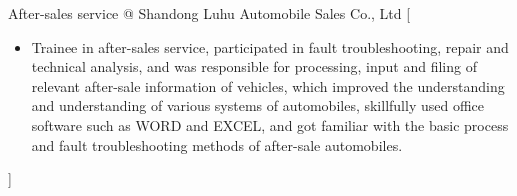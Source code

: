 \documentclass{resume}
\begin{document}
\begin{experiences}
	{After-sales service @ Shandong Luhu Automobile Sales Co., Ltd}%
	[\begin{itemize}
		\item Trainee in after-sales service, participated in fault troubleshooting, repair and technical analysis, and was responsible for processing, input and filing of relevant after-sale information of vehicles, which improved the understanding and understanding of various systems of automobiles, skillfully used office software such as WORD and EXCEL, and got familiar with the basic process and fault troubleshooting methods of after-sale automobiles.
	\end{itemize}]
	
\end{experiences}


	\begin{competences}[10em]
		
		
	\end{competences}


\clearpage
\end{document}
